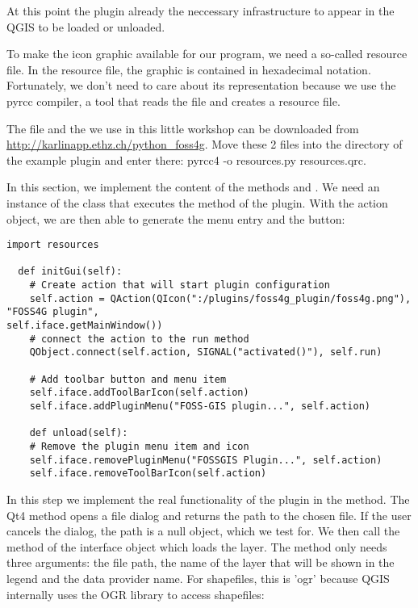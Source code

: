 At this point the plugin already the neccessary infrastructure to appear in
the QGIS  to be
loaded or unloaded. 


To make the icon graphic available for our program, we need a so-called
resource file. In the resource file, the graphic is contained in hexadecimal
notation. Fortunately, we don't need to care about its representation because
we use the pyrcc compiler, a tool that reads the file
 and creates a resource file. 

The file  and the  we use in
this little workshop can be downloaded from
\url{http://karlinapp.ethz.ch/python\_foss4g}. Move these 2 files into the
directory of the example plugin
 and enter there: pyrcc4 -o
resources.py resources.qrc.


In this section, we implement the content of the methods  and
. We need an instance of the class  that executes the
 method of the plugin. With the action object, we are then able to
generate the menu entry and the button:

\begin{verbatim}
import resources

  def initGui(self):
    # Create action that will start plugin configuration
    self.action = QAction(QIcon(":/plugins/foss4g_plugin/foss4g.png"), "FOSS4G plugin",
self.iface.getMainWindow())
    # connect the action to the run method
    QObject.connect(self.action, SIGNAL("activated()"), self.run)

    # Add toolbar button and menu item
    self.iface.addToolBarIcon(self.action)
    self.iface.addPluginMenu("FOSS-GIS plugin...", self.action)

    def unload(self):
    # Remove the plugin menu item and icon
    self.iface.removePluginMenu("FOSSGIS Plugin...", self.action)
    self.iface.removeToolBarIcon(self.action)
\end{verbatim}


In this step we implement the real functionality of the plugin in the
 method. The Qt4 method 
opens a file dialog and returns the path to the chosen file. If the user
cancels the dialog, the path is a null object, which we test for. We then
call the method  of the interface object which loads
the layer. The method only needs three arguments: the file path, the name of
the layer that will be shown in the legend and the data provider name. For
shapefiles, this is 'ogr' because QGIS internally uses the OGR library to
access shapefiles:

